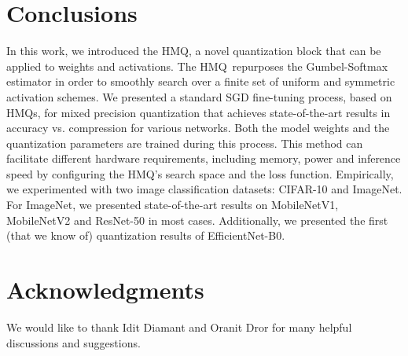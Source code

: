 \documentclass{article}
\newcommand{\qb}{HMQ}
\begin{document}
\section{Conclusions}\label{sec:conclusion}
In this work, we introduced the \qb, a novel quantization block that can be applied to weights and activations.
The \qb\ repurposes the Gumbel-Softmax estimator in order to smoothly search over a finite set of uniform and symmetric activation schemes. 
We presented a standard SGD fine-tuning process, based on \qb s, for mixed precision quantization that achieves state-of-the-art results in accuracy vs. compression for various networks.
Both the model weights and the quantization parameters are trained during this process.
This method can facilitate different hardware requirements, including memory, power and inference speed by configuring the \qb's search space and the loss function.
Empirically, we experimented with two image classification datasets: CIFAR-10 and ImageNet.
For ImageNet, we presented state-of-the-art results on MobileNetV1, MobileNetV2 and ResNet-50 in most cases.
Additionally, we presented the first (that we know of) quantization results of EfficientNet-B0.

\section*{Acknowledgments}\label{sec:ack}
We would like to thank Idit Diamant and Oranit Dror for many helpful discussions and suggestions.




\end{document}
